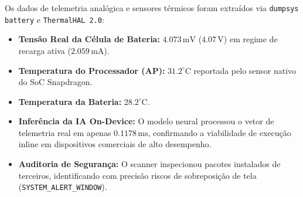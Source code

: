 Os dados de telemetria analógica e sensores térmicos foram extraídos via \texttt{dumpsys battery} e \texttt{ThermalHAL 2.0}:
\begin{itemize}
    \item \textbf{Tensão Real da Célula de Bateria:} $4.073\,\text{mV}$ ($4.07\,\text{V}$) em regime de recarga ativa ($2.059\,\text{mA}$).
    \item \textbf{Temperatura do Processador (AP):} $31.2^\circ\text{C}$ reportada pelo sensor nativo do SoC Snapdragon.
    \item \textbf{Temperatura da Bateria:} $28.2^\circ\text{C}$.
    \item \textbf{Inferência da IA On-Device:} O modelo neural processou o vetor de telemetria real em apenas \textbf{$0.1178\,\text{ms}$}, confirmando a viabilidade de execução inline em dispositivos comerciais de alto desempenho.
    \item \textbf{Auditoria de Segurança:} O scanner inspecionou pacotes instalados de terceiros, identificando com precisão riscos de sobreposição de tela (\texttt{SYSTEM\_ALERT\_WINDOW}).
\end{itemize}

